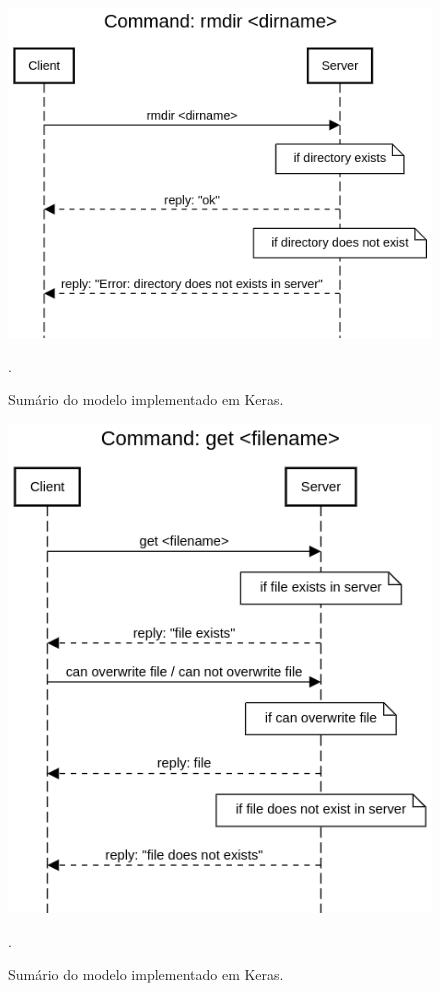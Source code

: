 \documentclass[conference]{IEEEtran}
\begin{document}
\begin{figure}[htbp]
\centering
\centerline{\includegraphics[scale=0.4]{diagrams/Command_rmdir_dirname.png}}
\caption{Sumário do modelo implementado em Keras.}.
\label{summary}
\end{figure}

\begin{figure}[htbp]
\centering
\centerline{\includegraphics[scale=0.4]{diagrams/Command_get_filename.png}}
\caption{Sumário do modelo implementado em Keras.}.
\label{summary}
\end{figure}
\end{document}
